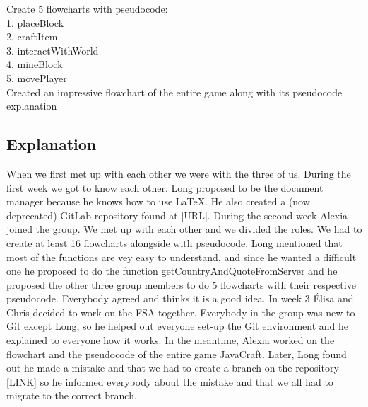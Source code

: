 Create 5 flowcharts with pseudocode: \\
1. placeBlock \\
2. craftItem \\
3. interactWithWorld \\
4. mineBlock \\
5. movePlayer \\
Created an impressive flowchart of the entire game along with its pseudocode explanation

\subsection{Explanation}

When we first met up with each other we were with the three of us. During the first week we got to know each other. Long proposed to be the document manager because he knows how to use LaTeX. He also created a (now deprecated) GitLab repository found at [URL]. During the second week Alexia joined the group. We met up with each other and we divided the roles. We had to create at least 16 flowcharts alongside with pseudocode. Long mentioned that most of the functions are vey easy to understand, and since he wanted a difficult one he proposed to do the function getCountryAndQuoteFromServer and he proposed the other three group members to do 5 flowcharts with their respective pseudocode. Everybody agreed and thinks it is a good idea.
In week 3 Élisa and Chris decided to work on the FSA together. Everybody in the group was new to Git except Long, so he helped out everyone set-up the Git environment and he explained to everyone how it works.  In the meantime, Alexia worked on the flowchart and the pseudocode of the entire game JavaCraft. Later, Long found out he made a mistake and that we had to create a branch on the repository [LINK] so he informed everybody about the mistake and that we all had to migrate to the correct branch.